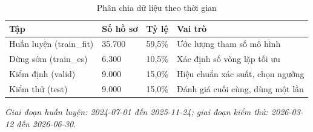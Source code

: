 \begin{table}[!htbp]
\centering
\caption{Phân chia dữ liệu theo thời gian}
\label{tab:split}
\small
\setlength{\tabcolsep}{5.0pt}
\begin{tabular}{@{}L{3.6cm}R{2.0cm}R{1.6cm}L{5.6cm}@{}}
\toprule
\textbf{Tập} & \textbf{Số hồ sơ} & \textbf{Tỷ lệ} & \textbf{Vai trò} \\
\midrule
Huấn luyện (train\_\allowbreak fit) & 35.700 & 59,5\% & Ước lượng tham số mô hình \\
Dừng sớm (train\_es) & 6.300 & 10,5\% & Xác định số vòng lặp tối ưu \\
Kiểm định (valid) & 9.000 & 15,0\% & Hiệu chuẩn xác suất, chọn ngưỡng \\
Kiểm thử (test) & 9.000 & 15,0\% & Đánh giá cuối cùng, dùng một lần \\
\bottomrule
\end{tabular}

\vspace{2pt}
{\footnotesize\itshape Giai đoạn huấn luyện: 2024-07-01 đến 2025-11-24; giai đoạn kiểm thử: 2026-03-12 đến 2026-06-30.}
\end{table}
